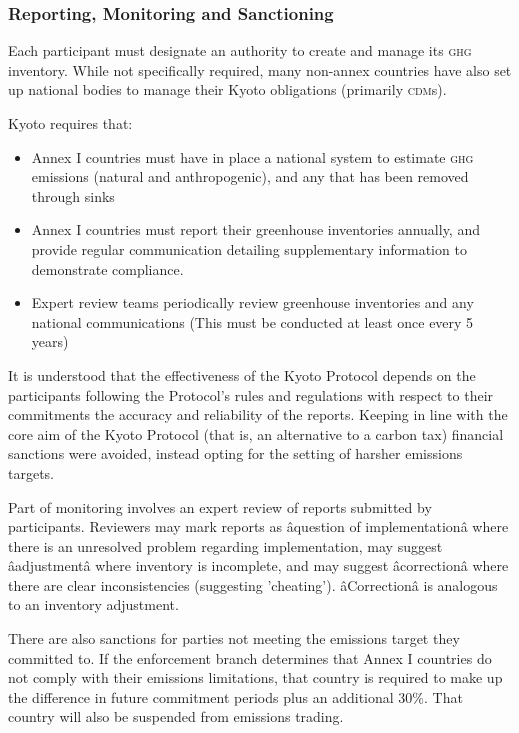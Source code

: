 \subsubsection{Reporting, Monitoring and Sanctioning}

Each participant must designate an authority to create and manage its \textsc{ghg} inventory. While not specifically required, many non-annex countries have also set up national bodies to manage their Kyoto obligations (primarily \textsc{cdm}s).

Kyoto requires that:~\cite{UNFCCC-Kyoto-guidelines}

\begin{itemize}
	\item Annex I countries must have in place a national system to estimate \textsc{ghg} emissions (natural and anthropogenic), and any \CO that has been removed through sinks
	\item Annex I countries must report their greenhouse inventories annually, and provide regular communication detailing supplementary information to demonstrate compliance.
	\item Expert review teams periodically review greenhouse inventories and any national communications (This must be conducted at least once every 5 years)
\end{itemize}

It is understood that the effectiveness of the Kyoto Protocol depends on the participants following the Protocol's rules and regulations with respect to their commitments the accuracy and reliability of the reports. Keeping in line with the core aim of the Kyoto Protocol (that is, an alternative to a carbon tax) financial sanctions were avoided, instead opting for the setting of harsher emissions targets.

Part of monitoring involves an expert review of reports submitted by participants. Reviewers may mark reports as âquestion of implementationâ where there is an unresolved problem regarding implementation, may suggest âadjustmentâ where inventory is incomplete, and may suggest âcorrectionâ where there are clear inconsistencies (suggesting 'cheating'). âCorrectionâ is analogous to an inventory adjustment.~\cite{UNFCCC-reporting-review}

There are also sanctions for parties not meeting the emissions target they committed to. If the enforcement branch determines that Annex I countries do not comply with their emissions limitations, that country is required to make up the difference in future commitment periods plus an additional 30\%. That country will also be suspended from emissions trading.~\cite{UNFCCC-compliance}

